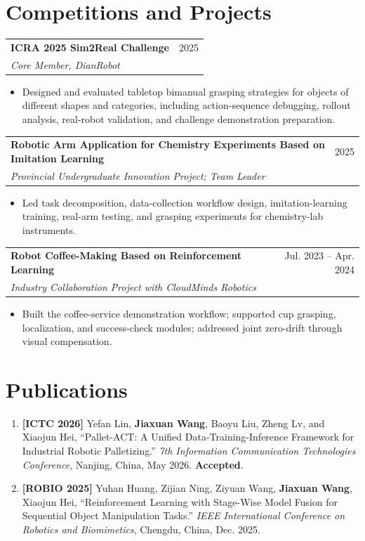 \documentclass[10pt, a4paper]{article}
\makeatletter
\newcommand{\projectEntry}[3]{
  \vspace{0.28em}
  \begin{tabularx}{\textwidth}{@{}>{\raggedright\arraybackslash}X r@{}}
    \textbf{#1} & \small #3 \\
    \textit{\small #2} & \\
  \end{tabularx}
  \vspace{-0.25em}
}
\makeatother
\begin{document}
\section{Competitions and Projects}
\projectEntry
  {ICRA 2025 Sim2Real Challenge}
  {Core Member, DianRobot}
  {2025}
\begin{itemize}
    \item Designed and evaluated tabletop bimanual grasping strategies for objects of different shapes and categories, including action-sequence debugging, rollout analysis, real-robot validation, and challenge demonstration preparation.
\end{itemize}
\projectEntry
  {Robotic Arm Application for Chemistry Experiments Based on Imitation Learning}
  {Provincial Undergraduate Innovation Project; Team Leader}
  {2025}
\begin{itemize}
    \item Led task decomposition, data-collection workflow design, imitation-learning training, real-arm testing, and grasping experiments for chemistry-lab instruments.
\end{itemize}
\projectEntry
  {Robot Coffee-Making Based on Reinforcement Learning}
  {Industry Collaboration Project with CloudMinds Robotics}
  {Jul. 2023 -- Apr. 2024}
\begin{itemize}
    \item Built the coffee-service demonstration workflow; supported cup grasping, localization, and success-check modules; addressed joint zero-drift through visual compensation.
\end{itemize}

\section{Publications}
\begin{enumerate}
    \item \textbf{[ICTC 2026]} Yefan Lin, \textbf{Jiaxuan Wang}, Baoyu Liu, Zheng Lv, and Xiaojun Hei, ``Pallet-ACT: A Unified Data-Training-Inference Framework for Industrial Robotic Palletizing.'' \textit{7th Information Communication Technologies Conference}, Nanjing, China, May 2026. \textbf{Accepted}.
    \item \textbf{[ROBIO 2025]} Yuhan Huang, Zijian Ning, Ziyuan Wang, \textbf{Jiaxuan Wang}, Xiaojun Hei, ``Reinforcement Learning with Stage-Wise Model Fusion for Sequential Object Manipulation Tasks.'' \textit{IEEE International Conference on Robotics and Biomimetics}, Chengdu, China, Dec. 2025.
\end{enumerate}
\end{document}
